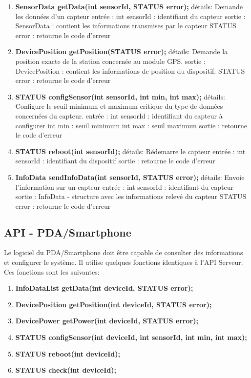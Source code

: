\begin{enumerate}

\item \textbf{SensorData getData(int sensorId, STATUS error);}
détails:
		Demande les données d'un capteur
entrée : 
		int sensorId : identifiant du capteur
sortie :
		SensorData : contient les informations transmises par le capteur 
		STATUS error : retourne le code d'erreur

\item \textbf{DevicePosition getPosition(STATUS error);}
détails:
		Demande la position exacte de la station concernée au module GPS.
sortie :
		DevicePosition : contient les informations de position du dispositif.
		STATUS error : retourne le code d'erreur


\item \textbf{STATUS configSensor(int sensorId, int min, int max);}
détails:
		Configure le seuil minimum et maximum critique du type de données concernées du capteur.
entrée :
		int sensorId : identifiant du capteur à configurer
		int min : seuil minimum
		int max : seuil maximum
sortie :
		retourne le code d'erreur

\item \textbf{STATUS reboot(int sensorId);}
détails:
		Rédemarre le capteur
entrée :
		int sensorId : identifiant du dispositif
sortie :
		retourne le code d'erreur

\item \textbf{InfoData sendInfoData(int sensorId, STATUS error);}
détails:
		Envoie l'information sur un capteur
entrée : 
		int sensorId : identifiant du capteur
sortie :
		InfoData - structure avec les informations relevé du capteur
		STATUS error : retourne le code d'erreur

\end{enumerate}

\subsection{API - PDA/Smartphone}

Le logiciel du PDA/Smartphone doit être capable de consulter des informations 
et configurer le système. Il utilise quelques fonctions identiques à l'API Serveur. 
Ces fonctions sont les suivantes:


\begin{enumerate}
\item \textbf{InfoDataList getData(int deviceId, STATUS error);}
\item \textbf{DevicePosition getPosition(int deviceId, STATUS error);}
\item \textbf{DevicePower getPower(int deviceId, STATUS error);}
\item \textbf{STATUS configSensor(int deviceId, int sensorId, int min, int max);}
\item \textbf{STATUS reboot(int deviceId);}
\item \textbf{STATUS check(int deviceId);}
\end{enumerate}
